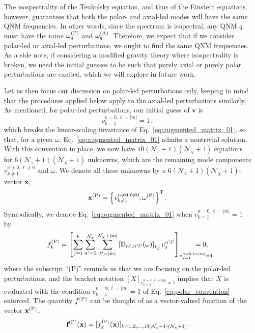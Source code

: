 \documentclass[aps,prx,amsmath,floats,floatfix,twocolumn,
  superscriptaddress,nofootinbib,showpacs]{revtex4-1}
\begin{document}
The isospectrality of the Teukolsky equation, and thus of the Einstein equations, however, guarantees that both the polar- and axial-led modes will have the same QNM frequencies. In other words, since the spectrum is isopectral, any QNM $q$ must have the same $\omega_{q}^{\rm (P)}$ and $\omega_{q}^{\rm (A)}$. Therefore, we expect that if we consider polar-led or axial-led perturbations, we ought to find the same QNM frequencies. 
As a side note, if considering a modified gravity theory where isospectrality is broken, we need the initial guesses to be such that purely axial or purely polar perturbations are excited, which we will explore in future work.

Let us then focus our discussion on polar-led perturbations only, keeping in mind that the procedures applied below apply to the axial-led perturbations similarly. 
As mentioned, for polar-led perturbations, our initial guess of $\textbf{v}$ is
\begin{equation}\label{eq:polar_convention}
v_{k=1}^{n=0,\ell=|m|} = 1\,,
\end{equation}
which breaks the linear-scaling invariance of Eq.~\eqref{eq:augmented_matrix_01}, so that, for a given $\omega$, Eq.~\eqref{eq:augmented_matrix_01} admits a nontrivial solution. 
With this convention in place, we now have $ 10 (\mathcal{N}_{z}+1)(\mathcal{N}_{\chi}+1) $ equations for $6 (\mathcal{N}_{z}+1)(\mathcal{N}_{\chi}+1)$ unknowns, which are the remaining mode components $v^{n \neq 0, \ell \neq 0}_{k\neq 1}$ and $\omega$. 
We denote all these unknowns by a $6 (\mathcal{N}_{z}+1)(\mathcal{N}_{\chi}+1)$-vector $\textbf{x}$, 
\begin{equation}
\textbf{x}^{\rm (P)} = \left\{ v^{n \neq 0, \ell \neq 0}_{k\neq 1}, \omega^{\rm (P)} \right\}^{\rm T}. 
\end{equation}
Symbolically, we denote Eq.~\eqref{eq:augmented_matrix_01} when $v_{k=1}^{n=0,\ell=|m|} = 1$ by 
\begin{equation} \label{eq:vector_equations_w_polar_convention}
f^{\rm (P)}_k = \left[ \sum_{j=1}^{6} \sum_{n'=0}^{\mathcal{N}_z} \sum_{\ell'=|m|}^{\mathcal{N}_{\chi}+|m|} \left[ \mathbb{D}_{n \ell, n' \ell'}(\omega) \right]_{kj} v_j^{n' \ell'} \right]_{v_{k=1}^{n=0,\ell=|m|} = 1} \hspace{-1cm}=0, 
\end{equation}
where the subscript ``(P)'' reminds us that we are focusing on the polar-led perturbations, and the bracket notation $[X]_{v_{k=1}^{n=0,\ell=|m|} = 1}$ implies that $X$ is evaluated with the condition $v_{k=1}^{n=0,\ell=|m|} = 1$ of Eq.~\eqref{eq:polar_convention} enforced. The quantity $f^{\rm (P)}$ can be thought of as a vector-valued function of the vector $\textbf{x}^{\rm (P)}$, 
\begin{equation}
\textbf{f}^{\rm (P)} (\textbf{x}) = [ f^{\rm (P)}_{k}(\textbf{x}) ]_{k=1, 2, ..., 10 (\mathcal{N}_{z}+1)(\mathcal{N}_{\chi}+1)}. 
\end{equation}
\end{document}

